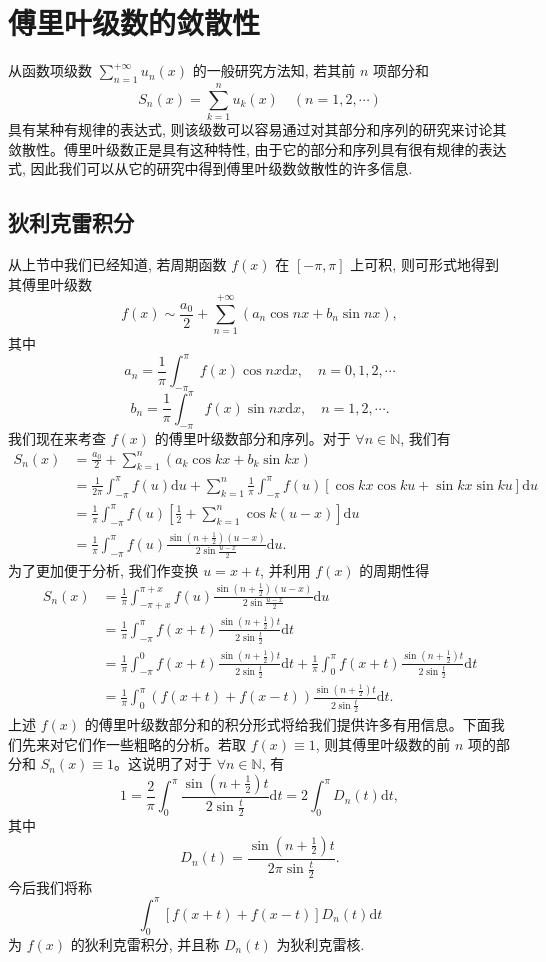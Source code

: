 \section{傅里叶级数的敛散性}
\label{sec:ma-12-2}

从函数项级数 $\sum\limits_{n=1}^{+\infty}u_n(x)$ 的一般研究方法知, 若其前 $n$ 项部分和
\[
  S_n(x)=\sum_{k=1}^n u_k(x)\quad(n=1,2,\cdots)
\]
具有某种有规律的表达式, 则该级数可以容易通过对其部分和序列的研究来讨论其敛散性。傅里叶级数正是具有这种特性, 由于它的部分和序列具有很有规律的表达式, 因此我们可以从它的研究中得到傅里叶级数敛散性的许多信息.

\subsection{狄利克雷积分}
\label{subsec:ma-12-2-1}

从上节中我们已经知道, 若周期函数 $f(x)$ 在 $[-\pi,\pi]$ 上可积, 则可形式地得到其傅里叶级数
\[
  f(x)\sim\frac{a_0}{2}+\sum_{n=1}^{+\infty}(a_n\cos nx+b_n\sin nx),
\]
其中
\[
  a_n=\frac1\pi\int_{-\pi}^{\pi}f(x)\cos nx\mathrm dx,\quad n=0,1,2,\cdots
\]
\[
  b_n=\frac1\pi\int_{-\pi}^{\pi}f(x)\sin nx\mathrm dx,\quad n=1,2,\cdots.
\]
我们现在来考查 $f(x)$ 的傅里叶级数部分和序列。对于 $\forall n\in\mathbb N$, 我们有
\[
\begin{aligned}
  S_n(x)
  &=\frac{a_0}{2}+\sum_{k=1}^n(a_k\cos kx+b_k\sin kx)\\
  &=\frac1{2\pi}\int_{-\pi}^{\pi}f(u)\mathrm du
    +\sum_{k=1}^n\frac1\pi\int_{-\pi}^{\pi}f(u)[\cos kx\cos ku+\sin kx\sin ku]\mathrm du\\
  &=\frac1\pi\int_{-\pi}^{\pi}f(u)\left[\frac12+\sum_{k=1}^n\cos k(u-x)\right]\mathrm du\\
  &=\frac1\pi\int_{-\pi}^{\pi}f(u)\frac{\sin\left(n+\frac12\right)(u-x)}{2\sin\frac{u-x}{2}}\mathrm du.
\end{aligned}
\]
为了更加便于分析, 我们作变换 $u=x+t$, 并利用 $f(x)$ 的周期性得
\[
\begin{aligned}
  S_n(x)
  &=\frac1\pi\int_{-\pi+x}^{\pi+x}
    f(u)\frac{\sin\left(n+\frac12\right)(u-x)}{2\sin\frac{u-x}{2}}\mathrm du\\
  &=\frac1\pi\int_{-\pi}^{\pi}
    f(x+t)\frac{\sin\left(n+\frac12\right)t}{2\sin\frac t2}\mathrm dt\\
  &=\frac1\pi\int_{-\pi}^{0}
    f(x+t)\frac{\sin\left(n+\frac12\right)t}{2\sin\frac t2}\mathrm dt
    +\frac1\pi\int_0^\pi
    f(x+t)\frac{\sin\left(n+\frac12\right)t}{2\sin\frac t2}\mathrm dt\\
  &=\frac1\pi\int_0^\pi
    (f(x+t)+f(x-t))\frac{\sin\left(n+\frac12\right)t}{2\sin\frac t2}\mathrm dt.
\end{aligned}
\]
上述 $f(x)$ 的傅里叶级数部分和的积分形式将给我们提供许多有用信息。下面我们先来对它们作一些粗略的分析。若取 $f(x)\equiv1$, 则其傅里叶级数的前 $n$ 项的部分和 $S_n(x)\equiv1$。这说明了对于 $\forall n\in\mathbb N$, 有
\[
  1=\frac2\pi\int_0^\pi\frac{\sin\left(n+\frac12\right)t}{2\sin\frac t2}\mathrm dt
  =2\int_0^\pi D_n(t)\mathrm dt,
\]
其中
\[
  D_n(t)=\frac{\sin\left(n+\frac12\right)t}{2\pi\sin\frac t2}.
\]
今后我们将称
\[
  \int_0^\pi [f(x+t)+f(x-t)]D_n(t)\mathrm dt
\]
为 $f(x)$ 的狄利克雷积分, 并且称 $D_n(t)$ 为狄利克雷核.

